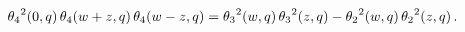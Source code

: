 \[{\mathop{\theta_{4}\/}\nolimits^{2}}\!\left(0,q\right)\mathop{\theta_{4}\/}%
\nolimits\!\left(w+z,q\right)\mathop{\theta_{4}\/}\nolimits\!\left(w-z,q\right%
)={\mathop{\theta_{3}\/}\nolimits^{2}}\!\left(w,q\right){\mathop{\theta_{3}\/}%
\nolimits^{2}}\!\left(z,q\right)-{\mathop{\theta_{2}\/}\nolimits^{2}}\!\left(w%
,q\right){\mathop{\theta_{2}\/}\nolimits^{2}}\!\left(z,q\right).\]